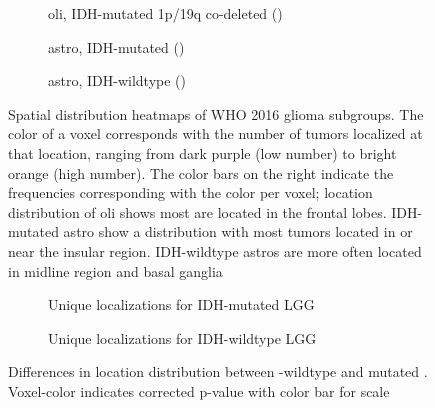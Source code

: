 \begin{figure}
    \centering
    \begin{subfigure}[b]{\textwidth}
        \centering
        \caption{\Gls{oli}, IDH-mutated 1p/19q co-deleted ()}\label{fig:LGG_location_heatmap_IDH_mut_1p19q_codel}
    \end{subfigure}
    \begin{subfigure}[b]{\textwidth}
        \centering
        \caption{\Gls{astro}, IDH-mutated ()}\label{fig:LGG_location_heatmap_IDH_mut_1p19q_intact}
    \end{subfigure}
    \begin{subfigure}[b]{\textwidth}
        \centering
        \caption{\Gls{astro}, IDH-wildtype ()}\label{fig:LGG_location_heatmap_IDH_intact_1p19q_intact}
    \end{subfigure}
    \caption{Spatial distribution heatmaps of \acrshort{WHO} 2016 glioma subgroups. The color of a voxel corresponds with the number of \glspl{tumor} localized at that location, ranging from dark purple (low number) to bright orange (high number). The color bars on the right indicate the frequencies corresponding with the color per voxel;
     location distribution of \gls{oli} shows most are located in the frontal lobes.
     \acrshort{IDH}-mutated \gls{astro} show a distribution with most \glspl{tumor} located in or near the insular region.
     \acrshort{IDH}-wildtype \glspl{astro} are more often located in midline region and basal ganglia}\label{fig:LGG_location_heatmap_subgroups}
\end{figure}

\begin{figure}
    \centering
    \begin{subfigure}[b]{\textwidth}
        \caption{Unique localizations for \acrshort{IDH}-mutated \acrshort{LGG}}\label{fig:LGG_location_p_values_IDH_mut_vs_IDH_wt_mutated}
    \end{subfigure}
    \begin{subfigure}[b]{\textwidth}
        \caption{Unique localizations for \acrshort{IDH}-wildtype \acrshort{LGG}}\label{fig:LGG_location_p_values_IDH_mut_vs_IDH_wt_wt}
    \end{subfigure}

    \caption{Differences in location distribution between -wildtype and mutated . Voxel-color indicates corrected p-value with color bar for scale}\label{fig:LGG_location_P_values}
\end{figure}

